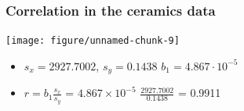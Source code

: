 \documentclass[handout]{beamer}\usepackage{graphicx, color}
\newenvironment{knitrout}{}{} %
\numberwithin{equation}{section}
\begin{document}
\begin{frame}[fragile]
\frametitle{Correlation in the ceramics data}
\begin{center}
\begin{knitrout}
\color{fgcolor}
\texttt{[image: figure/unnamed-chunk-9]} 

\end{knitrout}

\end{center}
\begin{itemize}
\pause \item $s_x = 2927.7002$, $s_y= 0.1438$  $b_1 = 4.867 \cdot 10^{-5}$
\pause \item $r = b_1 \frac{s_x}{s_y} $  = \ensuremath{4.867\times 10^{-5}} $\frac{2927.7002}{0.1438}$ = 0.9911
\end{itemize}

\end{frame}
\end{document}
